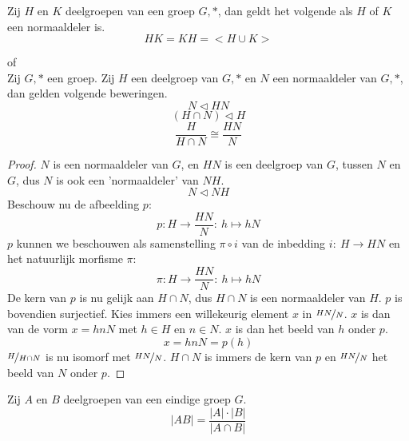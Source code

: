 \documentclass[main.tex]{subfiles}
\begin{document}
\begin{gev}
  Zij $H$ en $K$ deelgroepen van een groep $G,*$, dan geldt het volgende als $H$ of $K$ een normaaldeler is.
  \[ HK = KH = <H\cup K> \]
\end{gev}

\begin{st}
   of \\
  Zij $G,*$ een groep. Zij $H$ een deelgroep van $G,*$ en $N$ een normaaldeler van $G,*$, dan gelden volgende beweringen.
  \[ N \triangleleft HN \]
  \[ (H \cap N) \triangleleft H \]
  \[ \frac{H}{H\cap N} \cong \frac{HN}{N} \]

  \begin{proof}
    $N$ is een normaaldeler van $G$, en $HN$ is een deelgroep van $G$, tussen $N$ en $G$, dus $N$ is ook een 'normaaldeler' van $NH$.
    \[ N \triangleleft NH \]
    Beschouw nu de afbeelding $p$:
    \[ p: H \rightarrow \frac{HN}{N}:\ h \mapsto hN \]
    $p$ kunnen we beschouwen als samenstelling $\pi \circ i$ van de inbedding $i:\ H\rightarrow HN$ en het natuurlijk morfisme $\pi$:
    \[ \pi: H \rightarrow \frac{HN}{N}:\ h \mapsto hN \]
    De kern van $p$ is nu gelijk aan $H\cap N$, dus $H \cap N$ is een normaaldeler van $H$.
    $p$ is bovendien surjectief.
    Kies immers een willekeurig element $x$ in $\nicefrac{HN}{N}$.
    $x$ is dan van de vorm $x=hnN$ met $h\in H$ en $n\in N$.
    $x$ is dan het beeld van $h$ onder $p$.
    \[ x = hnN = p(h) \]
    $\nicefrac{H}{H\cap N}$ is nu isomorf met $\nicefrac{HN}{N}$.
    $H\cap N$ is immers de kern van $p$ en $\nicefrac{HN}{N}$ het beeld van $N$ onder $p$.
  \end{proof}
\end{st}

\begin{st}
  Zij $A$ en $B$ deelgroepen van een eindige groep $G$.
  \[ |AB| = \frac{|A|\cdot|B|}{|A\cap B|} \]
\end{st}
\end{document}
